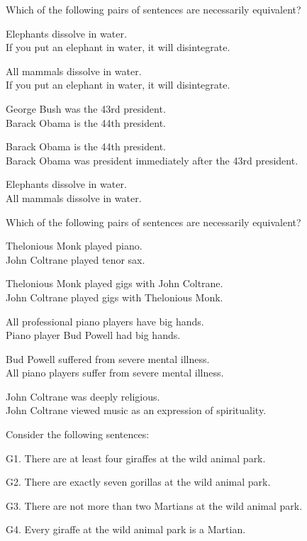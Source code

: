 \problempart Which of the following pairs of sentences are necessarily  equivalent? 

\begin{compactlist}
\item Elephants dissolve in water.	\\
	If you put an elephant in water, it will disintegrate.
\item All mammals dissolve in water.\\		
	If you put an elephant in water, it will disintegrate.
\item George Bush was the 43rd president. \\
	 Barack Obama is the 44th president.
\item Barack Obama is the 44th president. \\
	  Barack Obama was president immediately after the 43rd president.
\item Elephants dissolve in water. 	\\	
	All mammals dissolve in water.
\end{compactlist}
\problempart Which of the following pairs of sentences are necessarily equivalent? 

\begin{compactlist}
\item  Thelonious Monk played piano.	\\
	John Coltrane played tenor sax.
\item  Thelonious Monk played gigs with John Coltrane.	\\
	John Coltrane played gigs with Thelonious Monk.
\item  All professional piano players have big hands.	\\
	Piano player Bud Powell had big hands.
\item  Bud Powell suffered from severe mental illness.	 \\
	All piano players suffer from severe mental illness.
\item John Coltrane was deeply religious.	 \\
John Coltrane viewed music as an expression of spirituality.
\end{compactlist}

\noindent \problempart Consider the following sentences: 
\begin{compactlist}%
\item[G1.] \label{itm:at_least_four}There are at least four giraffes at the wild animal park.
\item[G2.] \label{itm:exactly_seven} There are exactly seven gorillas at the wild animal park.
\item[G3.] \label{itm:not_more_than_two} There are not more than two Martians at the wild animal park.
\item[G4.] \label{itm:martians} Every giraffe at the wild animal park is a Martian.
\end{compactlist}

